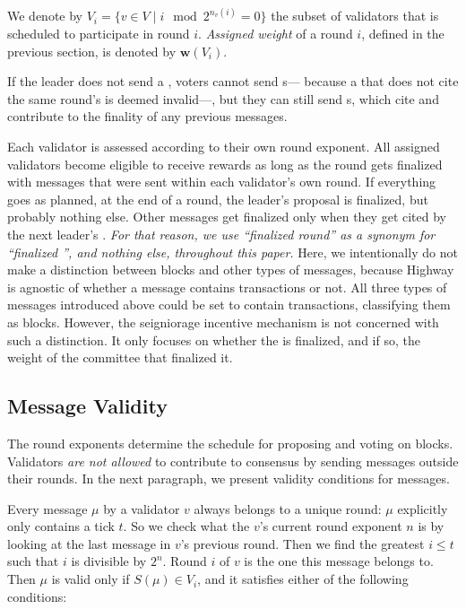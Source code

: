 We denote by $V_{i}=\{v\in V \mid i \mod 2^{n_v(i)} = 0\}$ the subset of validators that is scheduled to participate in round $i$. \emph{Assigned weight} of a round $i$, defined in the previous section, is denoted by $\boldsymbol{w}(V_i)$.

If the leader does not send a \PROP, voters cannot send \CONF{}s--- because a \CONF that does not cite the same round's \PROP is deemed invalid---, but they can still send \WIT{}s, which cite and contribute to the finality of any previous messages.

Each validator is assessed according to their own round exponent. All assigned validators become eligible to receive rewards as long as the round gets finalized with messages that were sent within each validator's own round. If everything goes as planned, at the end of a round, the leader's proposal is finalized, but probably nothing else. Other messages get finalized only when they get cited by the next leader's \PROP. \emph{For that reason, we use ``finalized round'' as a synonym for ``finalized \PROP'', and nothing else, throughout this paper.} Here, we intentionally do not make a distinction between blocks and other types of messages, because Highway is agnostic of whether a message contains transactions or not. All three types of messages introduced above could be set to contain transactions, classifying them as blocks. However, the seigniorage incentive mechanism is not concerned with such a distinction. It only focuses on whether the \PROP is finalized, and if so, the weight of the committee that finalized it.

\subsection{Message Validity}
\label{sec:message-validity}

The round exponents determine the schedule for proposing and voting on blocks. Validators \emph{are not allowed} to contribute to consensus by sending messages outside their rounds. In the next paragraph, we present validity conditions for messages.

Every message $\mu$ by a validator $v$ always belongs to a unique round: $\mu$ explicitly only contains a tick $t$. So we check what the $v$'s current round exponent $n$ is by looking at the last message in $v$'s previous round. Then we find the greatest $i\leq t$ such that $i$ is divisible by $2^n$. Round $i$ of $v$ is the one this message belongs to. Then $\mu$ is valid only if $S(\mu)\in V_i$, and it satisfies either of the following conditions:

